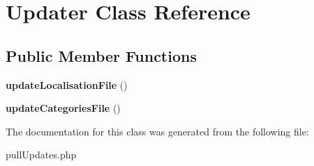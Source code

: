 \hypertarget{classUpdater}{
\section{Updater Class Reference}
\label{classUpdater}
}
\subsection*{Public Member Functions}
\begin{DoxyCompactItemize}
\item 
\hypertarget{classUpdater_ac2b7dba1655de5667429fb0faa4b588c}{
{\bfseries updateLocalisationFile} ()}
\label{classUpdater_ac2b7dba1655de5667429fb0faa4b588c}

\item 
\hypertarget{classUpdater_ad0a7978c7cb610eb0f0394bc1f039419}{
{\bfseries updateCategoriesFile} ()}
\label{classUpdater_ad0a7978c7cb610eb0f0394bc1f039419}

\end{DoxyCompactItemize}


The documentation for this class was generated from the following file:\begin{DoxyCompactItemize}
\item 
pullUpdates.php\end{DoxyCompactItemize}
